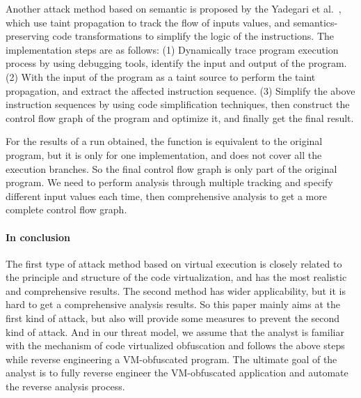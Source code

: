 Another attack method based on semantic is proposed by the Yadegari et al.~\cite{Yadegari2015A}, which use taint propagation to track the flow of inputs values, and semantics-preserving code transformations to simplify the logic of the instructions. The implementation steps are as follows: (1) Dynamically trace program execution process by using debugging tools, identify the input and output of the program. (2) With the input of the program as a taint source to perform the taint propagation, and extract the affected instruction sequence. (3) Simplify the above instruction sequences by using code simplification techniques, then construct the control flow graph of the program and optimize it, and finally get the final result.

For the results of a run obtained, the function is equivalent to the original program, but it is only for one implementation, and does not cover all the execution branches. So the final control flow graph is only part of the original program. We need to perform analysis through multiple tracking and specify different input values each time, then comprehensive analysis to get a more complete control flow graph.

\paragraph{In conclusion}
The first type of attack method based on virtual execution is closely related to the principle and structure of the code virtualization, and has the most realistic and comprehensive results. The second method has wider applicability, but it is hard to get a comprehensive analysis results. So this paper mainly aims at the first kind of attack, but also will provide some measures to prevent the second kind of attack. And in our threat model, we assume that the analyst is familiar with the mechanism of code virtualized obfuscation and follows the above steps while reverse engineering a VM-obfuscated program. The ultimate goal of the analyst is to fully reverse engineer the VM-obfuscated application and automate the reverse analysis process.
